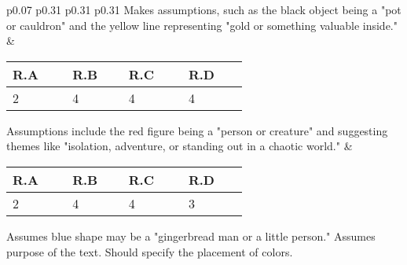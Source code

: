\documentclass[sigconf]{acmart}
\begin{document}
\begin{table*}[h]
{\begin{tabular}{p{0.07\linewidth} p{0.31\linewidth} p{0.31\linewidth} p{0.31\linewidth}}
        \newline
        Makes assumptions, such as the black object being a "pot or cauldron" and the yellow line representing "gold or something valuable inside."
        & 
        \begin{tabular}{| p{0.17\linewidth} | p{0.16\linewidth} | p{0.17\linewidth} | p{0.17\linewidth} |}
          \textbf{R.A} & \textbf{R.B} & \textbf{R.C} & \textbf{R.D} \\
          \hline
          2 & 4 & 4 & 4 \\
          \hline
        \end{tabular}
        \vspace{0.2em}
        \newline
        Assumptions include the red figure being a "person or creature" and suggesting themes like "isolation, adventure, or standing out in a chaotic world." 
        &
        \begin{tabular}{| p{0.17\linewidth} | p{0.16\linewidth} | p{0.17\linewidth} | p{0.17\linewidth} |}
          \textbf{R.A} & \textbf{R.B} & \textbf{R.C} & \textbf{R.D} \\
          \hline
          2 & 4 & 4 & 3 \\
          \hline
        \end{tabular}
        \newline
        Assumes blue shape may be a "gingerbread man or a little person." Assumes purpose of the text. Should specify the placement of colors. \hfill


\end{tabular}}
\end{table*}
\end{document}
